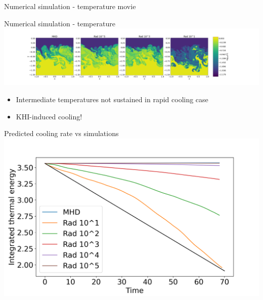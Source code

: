 \documentclass[10pt,aspectratio=169,usenames,dvipsnames]{beamer}
\begin{document}
\begin{frame}{Numerical simulation - temperature movie}
\end{frame}

\begin{frame}{Numerical simulation - temperature}
    \centering
   \includegraphics[width=0.99\linewidth,clip=true,trim=7.9cm 0.8cm 8.9cm 0.8cm]{2023Dundee/Figures/denstempevo_T_t0071.png}
\begin{itemize}
    \item Intermediate temperatures not sustained in rapid cooling case
    \item KHI-induced cooling!
\end{itemize}
\end{frame}

\begin{frame}{Predicted cooling rate vs simulations}
\centering
\includegraphics[width=0.85\linewidth,clip=true,trim=0.0cm 0.0cm 0.9cm 0.8cm]{2023Dundee/Figures/integrated_thermal_energy_2.png}
\end{frame}

\end{document}
